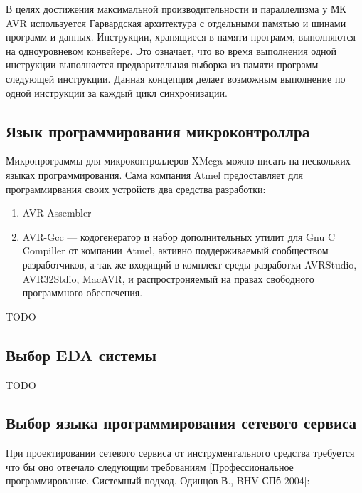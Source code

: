 В целях достижения максимальной производительности и параллелизма у МК AVR используется Гарвардская архитектура с отдельными памятью и шинами программ и данных. Инструкции, хранящиеся в памяти программ, выполняются на одноуровневом конвейере. Это означает, что во время выполнения одной инструкции выполняется предварительная выборка из памяти программ следующей инструкции. Данная концепция делает возможным выполнение по одной инструкции за каждый цикл синхронизации.



\subsection{Язык программирования микроконтроллра}
Микропрограммы для микроконтроллеров XMega можно писать на нескольких языках программирования.
Сама компания Atmel предоставляет для программирвания своих устройств два средства разработки:
	\begin{enumerate}
		\item{}AVR Assembler
		\item{}AVR-Gcc --- кодогенератор и набор дополнительных утилит для Gnu C Compiller от компании Atmel, активно поддерживаемый сообществом разработчиков, а так же входящий в комплект среды разработки AVRStudio, AVR32Stdio, MacAVR, и распростроняемый на правах свободного программного обеспечения.
	\end{enumerate}

TODO






\subsection{Выбор EDA системы}
TODO

\subsection{Выбор языка программирования сетевого сервиса}

При проектировании сетевого сервиса от инструментального средства требуется что бы оно отвечало следующим требованиям [Профессиональное программирование. Системный подход. Одинцов В., BHV-СПб 2004]:

